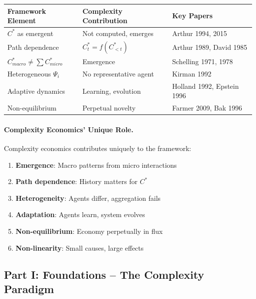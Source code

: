 \begin{center}
\renewcommand{\arraystretch}{1.4}
\begin{tabular}{|l|l|l|}
\hline
\textbf{Framework Element} & \textbf{Complexity Contribution} & \textbf{Key Papers} \\
\hline
$C^*$ as emergent & Not computed, emerges & Arthur 1994, 2015 \\
Path dependence & $C^*_t = f(C^*_{<t})$ & Arthur 1989, David 1985 \\
$C^*_{macro} \neq \sum C^*_{micro}$ & Emergence & Schelling 1971, 1978 \\
Heterogeneous $\Psi_i$ & No representative agent & Kirman 1992 \\
Adaptive dynamics & Learning, evolution & Holland 1992, Epstein 1996 \\
Non-equilibrium & Perpetual novelty & Farmer 2009, Bak 1996 \\
\hline
\end{tabular}
\end{center}

\paragraph{Complexity Economics' Unique Role.}
Complexity economics contributes uniquely to the framework:
\begin{enumerate}
    \item \textbf{Emergence}: Macro patterns from micro interactions
    \item \textbf{Path dependence}: History matters for $C^*$
    \item \textbf{Heterogeneity}: Agents differ, aggregation fails
    \item \textbf{Adaptation}: Agents learn, system evolves
    \item \textbf{Non-equilibrium}: Economy perpetually in flux
    \item \textbf{Non-linearity}: Small causes, large effects
\end{enumerate}

\subsection{Part I: Foundations – The Complexity Paradigm}

